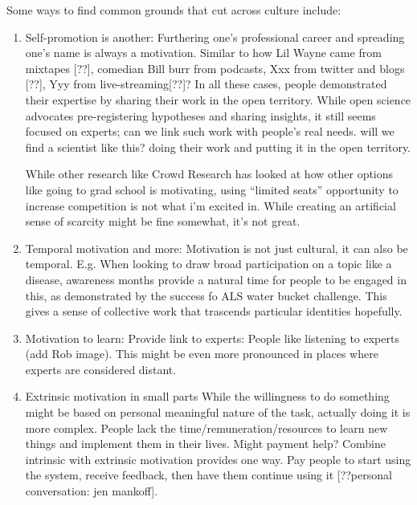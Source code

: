 Some ways to find common grounds that cut across culture include: 
\begin{enumerate}
\item Self-promotion is another: Furthering one’s professional career and spreading one’s name is always a motivation. Similar to how Lil Wayne came from mixtapes [??], comedian Bill burr from podcasts, Xxx from twitter and blogs [??], Yyy from live-streaming[??]? In all these cases, people demonstrated their expertise by sharing their work in the open territory. While open science advocates pre-registering hypotheses and sharing insights, it still seems focused on experts; can we link such work with people’s real needs. will we find a scientist like this? doing their work and putting it in the open territory.

While other research like Crowd Research has looked at how other options like going to grad school is motivating, using “limited seats” opportunity to increase competition is not what i’m excited in. While creating an artificial sense of scarcity might be fine somewhat, it's not great. 

\item Temporal motivation and more: Motivation is not just cultural, it can also be temporal. E.g. When looking to draw broad participation on a topic like a disease, awareness months provide a natural time for people to be engaged in this, as demonstrated by the success fo ALS water bucket challenge. This gives a sense of collective work that trascends particular identities hopefully.

\item {Motivation to learn: Provide link to experts}: People like listening to experts (add Rob image). This might be even more pronounced in places where experts are considered distant.

\item{Extrinsic motivation in small parts}
While the willingness to do something might be based on personal meaningful nature of the task, actually doing it is more complex. People lack the time/remuneration/resources to learn new things and implement them in their lives. Might payment help? Combine intrinsic with extrinsic motivation provides one way. Pay people to start using the system, receive feedback, then have them continue using it [??personal conversation: jen mankoff]. 
\end{enumerate}

